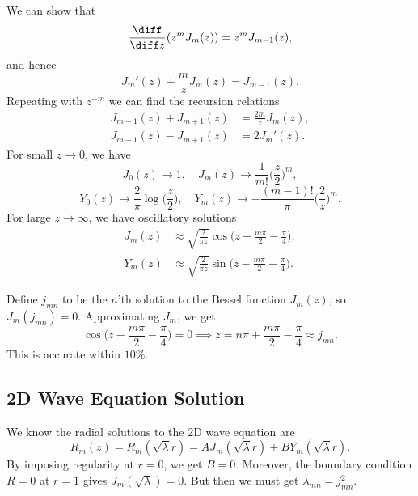 \documentclass[12pt]{article}
\begin{document}
We can show that
\[
	\frac{\diff}{\diff z} (z^{m} J_m(z)) = z^{m}J_{m-1}(z)
,\]
and hence
\[
	J_m'(z) + \frac{m}{z}J_m(z) = J_{m-1}(z)
.\]
Repeating with $z^{-m}$ we can find the recursion relations
\begin{align*}
	J_{m-1}(z) + J_{m+1}(z) &= \frac{2m}{z} J_m(z), \\
	J_{m-1}(z) - J_{m+1}(z) &= 2 J_m'(z).
\end{align*}
For small $z \to 0$, we have
\[
	J_0(z) \to 1, \quad J_m(z) \to \frac{1}{m!} \biggl( \frac{z}{2} \biggr)^{m}
,\]
\[
	Y_0(z) \to \frac{2}{\pi} \log \biggl( \frac{z}{2} \biggr), \quad Y_m(z) \to - \frac{(m-1)!}{\pi} \biggl( \frac{2}{z} \biggr)^{m}
.\]
For large $z \to \infty$, we have oscillatory solutions
\begin{align*}
	J_m(z) &\approx \sqrt{\frac{2}{\pi z}} \cos \biggl( z - \frac{m \pi}{2} - \frac{\pi}{4} \biggr), \\
	Y_m(z) &\approx \sqrt{\frac{2}{\pi z}} \sin \biggl( z - \frac{m \pi}{2} - \frac{\pi}{4} \biggr).
\end{align*}

Define $j_{mn}$ to be the $n$'th solution to the Bessel function $J_m(z)$, so $J_m(j_{mn}) = 0$. Approximating $J_m$, we get
\[
	\cos \biggl( z - \frac{m \pi}{2} - \frac{\pi}{4} \biggr) = 0
\implies z = n \pi + \frac{m \pi}{2} - \frac{\pi}{4} \approx \tilde j_{mn}
.\]
This is accurate within $10\%$.

\subsection{2D Wave Equation Solution}%
\label{sub:2d_wave_equation_solution}

We know the radial solutions to the 2D wave equation are
\[
	R_m(z) = R_m(\sqrt \lambda r) = A J_m(\sqrt \lambda r) + B Y_m(\sqrt \lambda r)
.\]
By imposing regularity at $r = 0$, we get $B = 0$. Moreover, the boundary condition $R = 0$ at $r = 1$ gives $J_m(\sqrt \lambda) = 0$. But then we must get $\lambda_{mn} = j_{mn}^{2}$.
\end{document}
